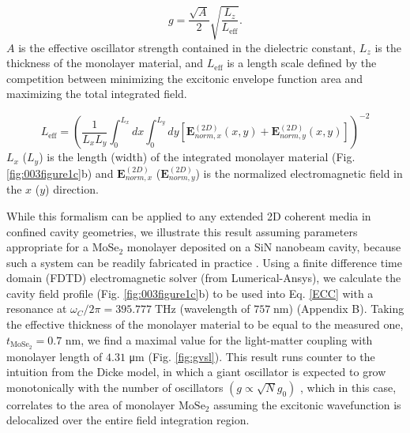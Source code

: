 \documentclass{achemso}
\begin{document}
\begin{equation}\label{rmc}
	g = \frac{\sqrt{A}}{2} \sqrt{\frac{L_{z}}{L_{\mathrm{eff}}}}.
\end{equation}
$A$ is the effective oscillator strength contained in the dielectric constant, $L_{z}$ is the thickness of the monolayer material, and $L_{\mathrm{eff}}$ is a length scale defined by the competition between minimizing the excitonic envelope function area and maximizing the total integrated field.

\begin{equation}\label{ECC}
	L_{\mathrm{eff}} = \left ( \frac{1}{L_{x} L_{y}} \int_{0}^{L_{x}} dx \int_{0}^{L_{y}} dy \left[ \mathbf{E}_{norm,x}^{(2D)} (x,y) + \mathbf{E}_{norm,y}^{(2D)} (x,y) \right] \right )^{-2}
\end{equation}
$L_{x}$ ($L_{y}$) is the length (width) of the integrated monolayer material (Fig. \ref{fig:003figure1c}b) and $\mathbf{E}_{norm,x}^{(2D)}$ ($\mathbf{E}_{norm,y}^{(2D)}$) is the normalized electromagnetic field in the $x$ ($y$) direction.

While this formalism can be applied to any extended 2D coherent media in confined cavity geometries, we illustrate this result assuming parameters appropriate for a $\mathrm{MoSe}_{2}$ monolayer deposited on a SiN nanobeam cavity, because such a system can be readily fabricated in practice \cite{rosser_dispersive_2020}. Using a finite difference time domain (FDTD) electromagnetic solver (from Lumerical-Ansys), we calculate the cavity field profile (Fig. \ref{fig:003figure1c}b) to be used into Eq. \ref{ECC} with a resonance at $\omega_{C}/2 \pi = 395.777 \; \si{\tera \hertz}$ (wavelength of  $757 \; \si{\nano \meter}$) (Appendix B). Taking the effective thickness of the monolayer material to be equal to the measured one, $t_{\mathrm{MoSe}_{2}} = 0.7$ \si{\nano \meter}, we find a maximal value for the light-matter coupling with monolayer length of $4.31$ \si{\micro \meter} (Fig. \ref{fig:gvsl}). This result runs counter to the intuition from the Dicke model, in which a giant oscillator is expected to grow monotonically with the number of oscillators $(g \propto \sqrt{N} g_{0})$ \cite{garraway_dicke_2011}, which in this case, correlates to the area of monolayer $\mathrm{MoSe}_{2}$ assuming the excitonic wavefunction is delocalized over the entire field integration region.
\end{document}
